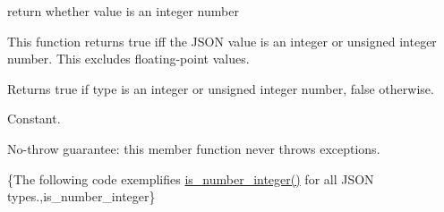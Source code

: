 return whether value is an integer number 

This function returns true iff the J\-S\-O\-N value is an integer or unsigned integer number. This excludes floating-\/point values.

\begin{DoxyReturn}{Returns}
{\ttfamily true} if type is an integer or unsigned integer number, {\ttfamily false} otherwise.
\end{DoxyReturn}
Constant.

No-\/throw guarantee\-: this member function never throws exceptions.

\{The following code exemplifies {\ttfamily \hyperlink{classnlohmann_1_1basic__json_a435c93d06ef28f8003c31f62ffe4aed1}{is\-\_\-number\-\_\-integer()}} for all J\-S\-O\-N types.,is\-\_\-number\-\_\-integer\}

